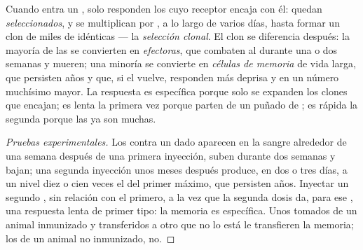 \begin{proposition}\label{prop:g12:adaptive-immunity:selection}
Cuando entra un , solo responden los  cuyo receptor
encaja con él: quedan \emph{seleccionados}, y se multiplican por
, a lo largo de varios días, hasta formar un clon de miles de
 idénticas --- la \emph{selección clonal}. El clon se diferencia después: la mayoría de las  se
convierten en \emph{ efectoras}, que combaten al 
durante una o dos semanas y mueren; una minoría se convierte en
\emph{células de memoria} de vida larga, que
persisten años y que, si el  vuelve, responden más deprisa y en
un número muchísimo mayor. La respuesta es específica porque solo se
expanden los clones que encajan; es lenta la primera vez porque parten
de un puñado de ; es rápida la segunda porque las  ya son muchas.
\end{proposition}
\begin{proof}[Pruebas experimentales]
Los  contra un  dado aparecen en la sangre alrededor
de una semana después de una primera inyección, suben durante dos
semanas y bajan; una segunda inyección unos meses después produce, en
dos o tres días,  a un nivel diez o cien veces el del primer
máximo, que persisten años. Inyectar un segundo , sin relación
con el primero, a la vez que la segunda dosis da, para ese ,
una respuesta lenta de primer tipo: la memoria es específica. Unos
 tomados de un animal inmunizado y transferidos a otro que no
lo está le transfieren la memoria; los de un animal no inmunizado, no.
\end{proof}

